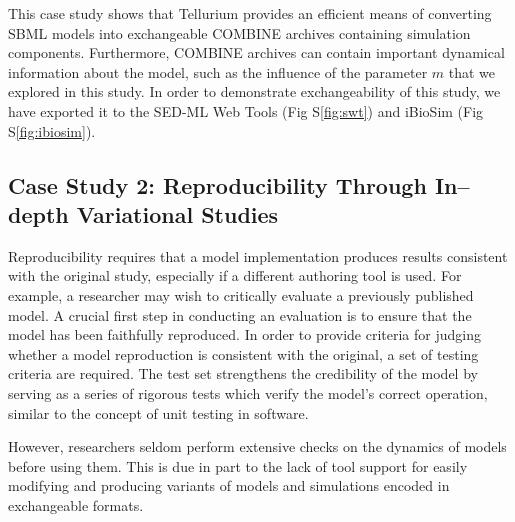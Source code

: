 \documentclass[10pt,letterpaper]{article}
\begin{document}
This case study shows that Tellurium provides an efficient means of converting SBML models into exchangeable COMBINE archives containing simulation components. Furthermore, COMBINE archives can contain important dynamical information about the model, such as the influence of the parameter $m$ that we explored in this study. In order to demonstrate exchangeability of this study, we have exported it to the SED-ML Web Tools \cite{bergmann2017sed} (Fig S\ref{fig:swt}) and iBioSim \cite{myers2009ibiosim} (Fig S\ref{fig:ibiosim}).

\subsection*{Case Study 2: Reproducibility Through In--depth Variational Studies}


Reproducibility requires that a model implementation produces results consistent with the original study, especially if a different authoring tool is used. For example, a researcher may wish to critically evaluate a previously published model. A crucial first step in conducting an evaluation is to ensure that the model has been faithfully reproduced. In order to provide criteria for judging whether a model reproduction is consistent with the original, a set of testing criteria are required. The test set strengthens the credibility of the model by serving as a series of rigorous tests which verify the model's correct operation, similar to the concept of unit testing in software.

However, researchers seldom perform extensive checks on the dynamics of models before using them. This is due in part to the lack of tool support for easily modifying and producing variants of models and simulations encoded in exchangeable formats.
\end{document}
